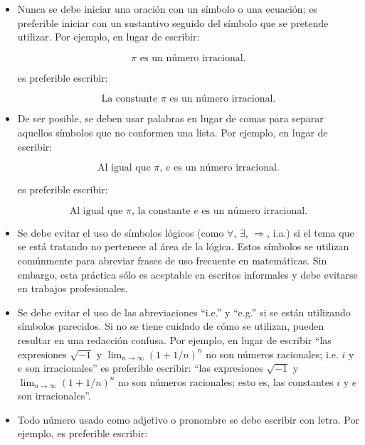 \begin{itemize}
    \item Nunca se debe iniciar una oración con un símbolo o una ecuación; es 
    preferible iniciar con un sustantivo seguido del símbolo que se pretende utilizar.
    Por ejemplo, en lugar de escribir:
    
    \[
        \pi\text{ es un número irracional.}
    \]
        
    es preferible escribir:
    
    \[
        \text{La constante }\pi\text{ es un número irracional.}
    \]
    
    \item De ser posible, se deben usar palabras en lugar de comas para separar
    aquellos símbolos que no conformen una lista. Por ejemplo, en lugar
    de escribir:
    
    \[
        \text{Al igual que }\pi\text{, }e\text{ es un número irracional.}
    \]
        
    es preferible escribir:
    
    \[
        \text{Al igual que }\pi\text{, la constante }e\text{ es un número irracional.}
    \]

    \item Se debe evitar el uso de símbolos lógicos (como $\forall$,
    $\exists$, $\Rightarrow$, i.a.) si el tema que se está tratando no
    pertenece al área de la lógica. Estos símbolos se utilizan comúnmente 
    para abreviar frases de uso frecuente en matemáticas. Sin embargo, esta 
    práctica sólo es aceptable en escritos informales y debe evitarse en 
    trabajos profesionales.

    \item Se debe evitar el uso de las abreviaciones ``i.e.'' y ``e.g.''
    si se están utilizando símbolos parecidos. Si no se tiene cuidado de cómo 
    se utilizan, pueden resultar en una redacción confusa. Por ejemplo, 
    en lugar de escribir ``las expresiones
    $\sqrt{-1}$ y $\lim_{n\to\infty}\left(1+1/n\right)^{n}$ no son números
    racionales; i.e. $i$ y $e$ son irracionales'' es preferible escribir:
    ``las expresiones $\sqrt{-1}$ y $\lim_{n\to\infty}\left(1+1/n\right)^{n}$
    no son números racionales; esto es, las constantes $i$ y $e$ son
    irracionales''.

    \item Todo número usado como adjetivo o pronombre se debe escribir con letra.
    Por ejemplo, es preferible escribir:
    

\end{itemize}
